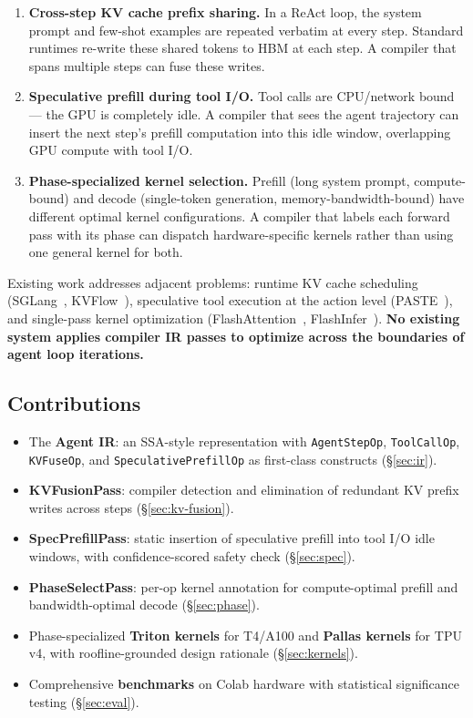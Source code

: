 \documentclass[10pt,twocolumn]{article}
\begin{document}
\begin{enumerate}
\item \textbf{Cross-step KV cache prefix sharing.} In a ReAct loop, the system
  prompt and few-shot examples are repeated verbatim at every step. Standard
  runtimes re-write these shared tokens to HBM at each step. A compiler that
  spans multiple steps can fuse these writes.

\item \textbf{Speculative prefill during tool I/O.} Tool calls are CPU/network
  bound --- the GPU is completely idle. A compiler that sees the agent trajectory
  can insert the next step's prefill computation into this idle window,
  overlapping GPU compute with tool I/O.

\item \textbf{Phase-specialized kernel selection.} Prefill (long system prompt,
  compute-bound) and decode (single-token generation, memory-bandwidth-bound) have
  different optimal kernel configurations. A compiler that labels each forward pass
  with its phase can dispatch hardware-specific kernels rather than using one
  general kernel for both.
\end{enumerate}

Existing work addresses adjacent problems: runtime KV cache scheduling
(SGLang~\cite{zheng2024sglang}, KVFlow~\cite{kvflow2025}),
speculative tool execution at the action level
(PASTE~\cite{paste2026}), and single-pass kernel optimization
(FlashAttention~\cite{dao2023flashattention2},
FlashInfer~\cite{ye2025flashinfer}). \textbf{No existing system applies
compiler IR passes to optimize across the boundaries of agent loop iterations.}

\subsection{Contributions}

\begin{itemize}
\item The \textbf{Agent IR}: an SSA-style representation with
  \texttt{AgentStepOp}, \texttt{ToolCallOp}, \texttt{KVFuseOp}, and
  \texttt{SpeculativePrefillOp} as first-class constructs (\S\ref{sec:ir}).
\item \textbf{KVFusionPass}: compiler detection and elimination of redundant
  KV prefix writes across steps (\S\ref{sec:kv-fusion}).
\item \textbf{SpecPrefillPass}: static insertion of speculative prefill
  into tool I/O idle windows, with confidence-scored safety check (\S\ref{sec:spec}).
\item \textbf{PhaseSelectPass}: per-op kernel annotation for compute-optimal
  prefill and bandwidth-optimal decode (\S\ref{sec:phase}).
\item Phase-specialized \textbf{Triton kernels} for T4/A100 and \textbf{Pallas
  kernels} for TPU v4, with roofline-grounded design rationale (\S\ref{sec:kernels}).
\item Comprehensive \textbf{benchmarks} on Colab hardware with statistical
  significance testing (\S\ref{sec:eval}).
\end{itemize}
\end{document}
